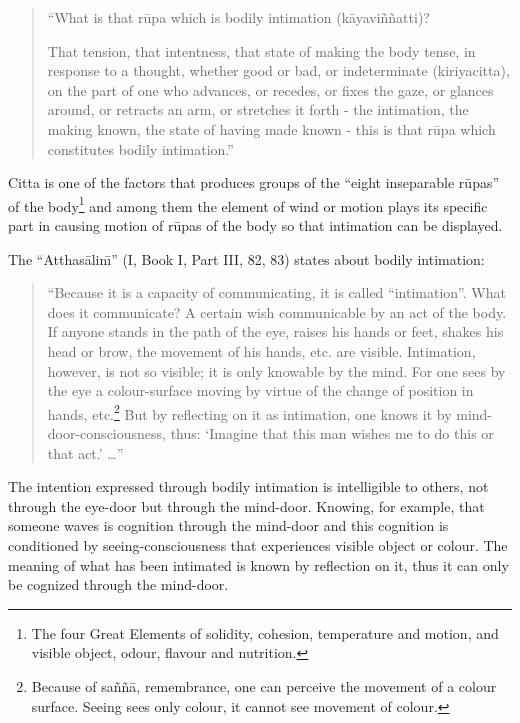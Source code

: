 \documentclass{book}
\begin{document}
\begin{quote}\begin{flushleft}
``What is that r\=upa which is bodily intimation (k{\=a}yavi\~n\~natti)?


That tension, that intentness, that state of making the body tense, in
response to a thought, whether good or bad, or indeterminate
(kiriyacitta), on the part of one who advances, or recedes, or fixes
the gaze, or glances around, or retracts an arm, or stretches it forth
- the intimation, the making known, the state of having made known
- this is that r\=upa which constitutes bodily intimation.''

\end{flushleft}\end{quote}



Citta is one of the factors that produces groups of the ``eight
inseparable r\=upas'' of the body\footnote{The four Great Elements
of solidity, cohesion, temperature and motion, and visible object,
odour, flavour and nutrition.} and among them the element of wind or
motion plays its specific part in causing motion of r\=upas of the body
so that intimation can be displayed. 

The ``Atthas{\=a}lin\=\i'' (I, Book I, Part III, 82, 83) states about
bodily intimation:

\begin{quote}\begin{flushleft}
``Because it is a capacity of communicating, it is called
``intimation''. What does it communicate? A certain wish communicable
by an act of the body. If anyone stands in the path of the eye, raises
his hands or feet, shakes his head or brow, the movement of his hands,
etc. are visible. Intimation, however, is not so visible; it is only
knowable by the mind. For one sees by the eye a colour-surface moving
by virtue of the change of position in hands, etc.\footnote{Because
of sa\~n\~n{\=a}, remembrance, one can perceive the movement of a
colour surface. Seeing sees only colour, it cannot see movement of
colour.} But by reflecting on it as intimation, one knows it by
mind-door-consciousness, thus: `Imagine that this man wishes me
to do this or that act.' \ldots''
\end{flushleft}\end{quote}




The intention expressed through bodily intimation is intelligible to
others, not through the eye-door but through the mind-door.
Knowing, for example, that someone waves is cognition through the
mind-door and this cognition is conditioned by seeing-consciousness
that experiences visible object or colour. The meaning of what has been
intimated is known by reflection on it, thus it can only be cognized
through the mind-door. 
\end{document}
